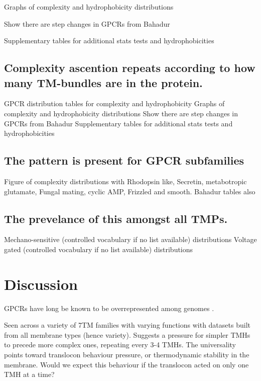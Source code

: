 Graphs of complexity and hydrophobicity distributions

Show there are step changes in GPCRs from Bahadur

Supplementary tables for additional stats tests and hydrophobicities

\subsection{Complexity ascention repeats according to how many TM-bundles are in the protein.}
GPCR distribution tables for complexity and hydrophobicity
Graphs of complexity and hydrophobicity distributions
Show there are step changes in GPCRs from Bahadur
Supplementary tables for additional stats tests and hydrophobicities

\subsection{The pattern is present for GPCR subfamilies}
Figure of complexity distributions with Rhodopsin like, Secretin, metabotropic glutamate, Fungal mating, cyclic AMP, Frizzled and smooth.
Bahadur tables also

\subsection{The prevelance of this amongst all TMPs.}
Mechano-sensitive (controlled vocabulary if no list available) distributions
Voltage gated (controlled vocabulary if no list available) distributions

\section{Discussion}
GPCRs have long be known to be overrepresented among genomes \cite{Remm2000}.

Seen across a variety of 7TM families with varying functions with datasets built from all membrane types (hence variety).
Suggests a pressure for simpler TMHs to precede more complex ones, repeating every 3-4 TMHs.
The universality points toward translocon behaviour pressure, or thermodynamic stability in the membrane.
Would we expect this behaviour if the translocon acted on only one TMH at a time?
